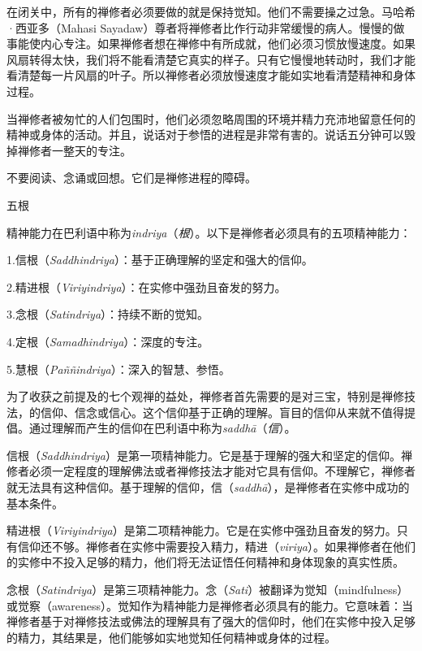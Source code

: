 在闭关中，所有的禅修者必须要做的就是保持觉知。他们不需要操之过急。马哈希·西亚多（Mahasi Sayadaw）尊者将禅修者比作行动非常缓慢的病人。慢慢的做事能使内心专注。如果禅修者想在禅修中有所成就，他们必须习惯放慢速度。如果风扇转得太快，我们将不能看清楚它真实的样子。只有它慢慢地转动时，我们才能看清楚每一片风扇的叶子。所以禅修者必须放慢速度才能如实地\1看清楚精神和身体过程。

当禅修者被匆忙的人们包围时，他们必须忽略周围的环境并精力充沛地留意任何的精神或身体的活动。并且，说话对于参悟的进程是非常有害的。说话五分钟可以毁掉禅修者一整天的专注。

不要阅读、念诵或回想。它们是禅修进程的障碍。

\ssssubsectnonib 五根

精神能力在巴利语中称为{\it indriya}（{\it 根}）。以下是禅修者必须具有的五项精神能力：

{
\leftskip=1.6pc
\item{1.}信根（{\it Saddhindriya}）：基于正确理解的坚定和强大的信仰。
\item{2.}精进根（{\it Viriyindriya}）：在实修中强劲且奋发的努力。
\item{3.}念根（{\it Satindriya}）：持续不断的觉知。
\item{4.}定根（{\it Samadhindriya}）：深度的专注。
\item{5.}慧根（{\it Pa\~n\~nindriya}）：深入的智慧、参悟。

}

为了收获之前提及的七个观禅的益处，禅修者首先需要的是对三宝，特别是禅修技法，的信仰、信念或信心。这个信仰基于正确的理解。盲目的信仰从来就不值得提倡。通过理解而产生的信仰在巴利语中称为{\it saddh\=a}（{\it 信}）。

信根（{\it Saddhindriya}）是第一项精神能力。它是基于理解的\1强大和坚定的信仰。禅修者必须一定程度的理解佛法或者禅修技法才能对它具有信仰。不理解它，禅修者就无法具有这种信仰。基于理解的信仰，信（{\it saddh\=a}），是禅修者在实修中成功的基本条件。

精进根（{\it Viriyindriya}）是第二项精神能力。它是在实修中强劲且奋发的努力。只有信仰还不够。禅修者在实修中需要投入精力，精进（{\it viriya}）。如果禅修者在他们的实修中不投入足够的精力，他们将无法证悟任何精神和身体现象的真实性质。

念根（{\it Satindriya}）是第三项精神能力。念（{\it Sati}）被翻译为觉知（mindfulness）或觉察（awareness）。觉知作为精神能力是禅修者必须具有的能力。它意味着：当禅修者基于对禅修技法或佛法的理解具有了强大的信仰时，他们在实修中投入足够的精力，其结果是，他们能够如实地觉知任何精神或身体的过程。

